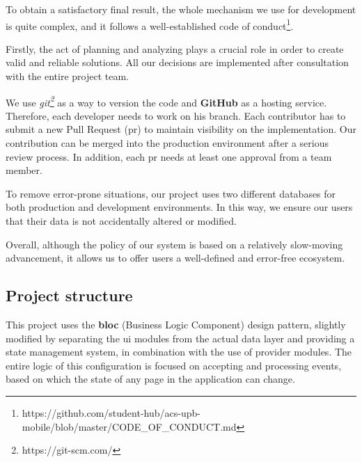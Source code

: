     To obtain a satisfactory final result, the whole mechanism we use for development is quite complex, and it follows a well-established code of conduct\footnote{https://github.com/student-hub/acs-upb-mobile/blob/master/CODE\_OF\_CONDUCT.md}.
    
    Firstly, the act of planning and analyzing plays a crucial role in order to create valid and reliable solutions. All our decisions are implemented after consultation with the entire project team.
    
    We use \textit{git\footnote{https://git-scm.com/}} as a way to version the code and \textbf{GitHub} as a hosting service. Therefore, each developer needs to work on his branch. Each contributor has to submit a new Pull Request (\acrshort{pr}) to maintain visibility on the implementation. Our contribution can be merged into the production environment after a serious review process. In addition, each \acrshort{pr} needs at least one approval from a team member.
    
    To remove error-prone situations, our project uses two different databases for both production and development environments. In this way, we ensure our users that their data is not accidentally altered or modified.
    
    Overall, although the policy of our system is based on a relatively slow-moving advancement, it allows us to offer users a well-defined and error-free ecosystem.

\subsection{Project structure} \label{5:project_structure}

    This project uses the \textbf{\acrshort{bloc}} (Business Logic Component) design pattern, slightly modified by separating the \acrshort{ui} modules from the actual data layer and providing a state management system, in combination with the use of provider modules. The entire logic of this configuration is focused on accepting and processing events, based on which the state of any page in the application can change.
    
